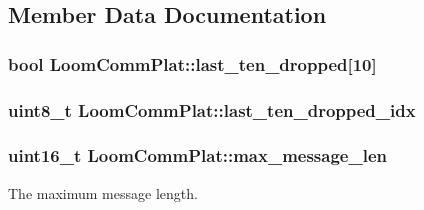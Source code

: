 \subsection{Member Data Documentation}
\subsubsection[{\texorpdfstring{last\+\_\+ten\+\_\+dropped}{last_ten_dropped}}]{\setlength{\rightskip}{0pt plus 5cm}bool Loom\+Comm\+Plat\+::last\+\_\+ten\+\_\+dropped\mbox{[}10\mbox{]}\hspace{0.3cm}{\ttfamily [protected]}}\hypertarget{class_loom_comm_plat_a447e99f2f727936f4aff95257ca98b62}{}\label{class_loom_comm_plat_a447e99f2f727936f4aff95257ca98b62}
\subsubsection[{\texorpdfstring{last\+\_\+ten\+\_\+dropped\+\_\+idx}{last_ten_dropped_idx}}]{\setlength{\rightskip}{0pt plus 5cm}uint8\+\_\+t Loom\+Comm\+Plat\+::last\+\_\+ten\+\_\+dropped\+\_\+idx\hspace{0.3cm}{\ttfamily [protected]}}\hypertarget{class_loom_comm_plat_a790dbad03d48713072716c23d515c6c0}{}\label{class_loom_comm_plat_a790dbad03d48713072716c23d515c6c0}
\subsubsection[{\texorpdfstring{max\+\_\+message\+\_\+len}{max_message_len}}]{\setlength{\rightskip}{0pt plus 5cm}uint16\+\_\+t Loom\+Comm\+Plat\+::max\+\_\+message\+\_\+len\hspace{0.3cm}{\ttfamily [protected]}}\hypertarget{class_loom_comm_plat_a2b4f69c2ec15028f5f281c3d1d399dba}{}\label{class_loom_comm_plat_a2b4f69c2ec15028f5f281c3d1d399dba}


The maximum message length. 

